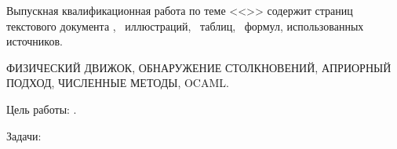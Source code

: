 
Выпускная квалификационная работа по теме <<\Topic>> содержит
\pageref{LastPage} страниц текстового документа \TODO,
\totalfigures~иллюстраций,
\totaltables~таблиц,
\totalequations~формул,
 использованных источников.

\MakeUppercase{
    физический движок,
    обнаружение столкновений,
    априорный подход,
    численные методы,
    OCaml.
}

Цель работы: \Target.

Задачи:

\Tasks
